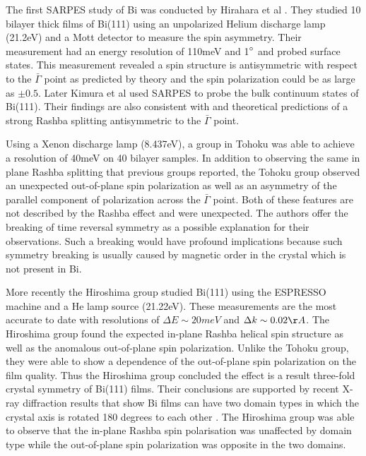 \documentclass[12pt]{article}
\begin{document}
The first SARPES study of Bi was conducted by Hirahara et al \cite{Hirahara}.
They studied 10 bilayer thick films of Bi(111) using an unpolarized Helium discharge lamp (21.2eV) and a Mott detector to measure the spin asymmetry.
Their measurement had an energy resolution of 110meV and 1$\degree$ and probed surface states.
This measurement revealed a spin structure is antisymmetric with respect to the $\bar{\Gamma}$ point as predicted by theory and the spin polarization could be as large as $\pm 0.5$.
Later Kimura et al used SARPES to probe the bulk continuum states of Bi(111).
Their findings are also consistent with \cite{Hirahara} and theoretical predictions of a strong Rashba splitting antisymmetric to the $\bar{\Gamma}$ point.

Using a Xenon discharge lamp (8.437eV), a group in Tohoku was able to achieve a resolution of 40meV on 40 bilayer samples\cite{Takayama}.
In addition to observing the same in plane Rashba splitting that previous groups reported, the Tohoku group observed an unexpected out-of-plane spin polarization as well as an asymmetry of the parallel component of polarization across the $\bar{\Gamma}$ point.
Both of these features are not described by the Rashba effect and were unexpected.
The authors offer the breaking of time reversal symmetry as a possible explanation for their observations.
Such a breaking would have profound implications because such symmetry breaking is usually caused by magnetic order in the crystal which is not present in Bi.

More recently the Hiroshima group studied Bi(111) using the ESPRESSO machine and a He lamp source (21.22eV)\cite{Miyahara}.
These measurements are the most accurate to date with resolutions of $\Delta E\sim20meV$ and $\Delta k\sim0.02\AA$.
The Hiroshima group found the expected in-plane Rashba helical spin structure as well as the anomalous out-of-plane spin polarization.
Unlike the Tohoku group, they were able to show a dependence of the out-of-plane spin polarization on the film quality.
Thus the Hiroshima group concluded the effect is a result three-fold crystal symmetry of Bi(111) films.
Their conclusions are supported by recent X-ray diffraction results that show Bi films can have two domain types in which the crystal axis is rotated 180 degrees to each other \cite{Shirasawa}.
The Hiroshima group was able to observe that the in-plane Rashba spin polarisation was unaffected by domain type while the out-of-plane spin polarization was opposite in the two domains.
\end{document}
